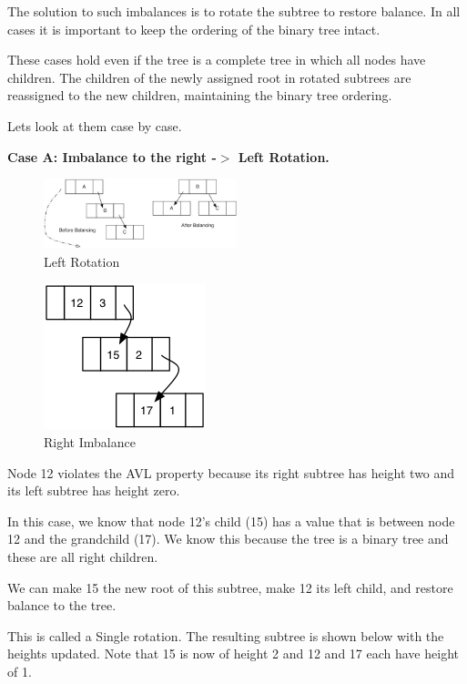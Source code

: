 The solution to such imbalances is to rotate the subtree to restore balance. In all cases it is important to keep the ordering of the binary tree intact.

These cases hold even if the tree is a complete tree in which all nodes have children. The children of the newly assigned root in rotated subtrees are reassigned to the new children, maintaining the binary tree ordering.

Lets look at them case by case.\newline

\textbf{Case A: Imbalance to the right -$>$ Left Rotation.}

\begin{figure}[H]
\centering
\includegraphics[width=0.5\textwidth]{pictures/leftrotate.jpg}
\caption{Left Rotation}
\label{fig:leftrotate}
\end{figure}

\begin{figure}[H]
\centering
\includegraphics{pictures/tree16.png}
\caption{Right Imbalance}
\label{fig:tree16}
\end{figure}

Node 12 violates the AVL property because its right subtree has height two and its left subtree has height zero.

In this case, we know that node 12’s child (15) has a value that is between node 12 and the grandchild (17). We know this because the tree is a binary tree and these are all right children.

We can make 15 the new root of this subtree, make 12 its left child, and restore balance to the tree.

This is called a Single rotation. The resulting subtree is shown below with the heights updated. Note that 15 is now of height 2 and 12 and 17 each have height of 1.

